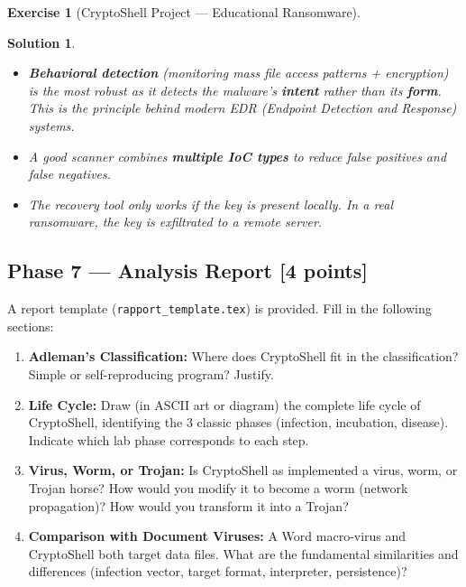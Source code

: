 \documentclass[a4paper,11pt]{article}
\theoremstyle{plain}
\newtheorem{correction}{Solution}
\theoremstyle{definition}
\newtheorem{exercice}{Exercise}
\begin{document}
\begin{exercice}[CryptoShell Project --- Educational Ransomware]
\begin{correction}
\begin{pointcle}
\begin{itemize}
    \item \textbf{Behavioral detection} (monitoring mass file access patterns + encryption) is the most robust as it detects the malware's \textbf{intent} rather than its \textbf{form}. This is the principle behind modern EDR (\textit{Endpoint Detection and Response}) systems.
    \item A good scanner combines \textbf{multiple IoC types} to reduce false positives and false negatives.
    \item The recovery tool only works if the key is present locally. In a real ransomware, the key is exfiltrated to a remote server.
\end{itemize}
\end{pointcle}

\end{correction}



\subsection*{Phase 7 --- Analysis Report \hfill \normalsize [4 points]}

\noindent A report template (\texttt{rapport\_template.tex}) is provided. Fill in the following sections:

\begin{enumerate}
\item[\textbf{R1)}] \textbf{Adleman's Classification:} Where does CryptoShell fit in the classification? Simple or self-reproducing program? Justify.

\item[\textbf{R2)}] \textbf{Life Cycle:} Draw (in ASCII art or diagram) the complete life cycle of CryptoShell, identifying the 3 classic phases (infection, incubation, disease). Indicate which lab phase corresponds to each step.

\item[\textbf{R3)}] \textbf{Virus, Worm, or Trojan:} Is CryptoShell as implemented a virus, worm, or Trojan horse? How would you modify it to become a worm (network propagation)? How would you transform it into a Trojan?

\item[\textbf{R4)}] \textbf{Comparison with Document Viruses:} A Word macro-virus and CryptoShell both target data files. What are the fundamental similarities and differences (infection vector, target format, interpreter, persistence)?


\end{enumerate}
\end{exercice}
\end{document}
